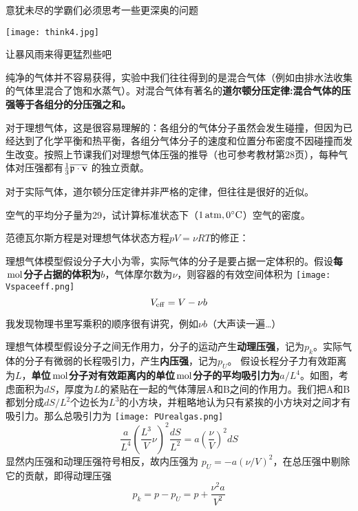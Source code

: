 \documentclass[CJK]{beamer}
\begin{document}
\begin{frame}
\bch
意犹未尽的学霸们必须思考一些更深奥的问题

\bcenter
{}
\texttt{[image: think4.jpg]}

让暴风雨来得更猛烈些吧
\emini
\ecenter
\ech
\end{frame}


\begin{frame}
\bch
纯净的气体并不容易获得，实验中我们往往得到的是混合气体（例如由排水法收集的气体里混合了饱和水蒸气）。对混合气体有著名的{\bf 道尔顿分压定律:混合气体的压强等于各组分的分压强之和。}

\skipline

对于理想气体，这是很容易理解的：各组分的气体分子虽然会发生碰撞，但因为已经达到了化学平衡和热平衡，各组分气体分子的速度和位置分布密度不因碰撞而发生改变。按照上节课我们对理想气体压强的推导（也可参考教材第28页），每种气体对压强都有$\frac{1}{3}\overline{\mathbf{\mathfrak{p}}\cdot{\mathbf{v}}}$ 的独立贡献。

\skipline

对于实际气体，道尔顿分压定律并非严格的定律，但往往是很好的近似。
\ech
\end{frame}


\begin{frame}
\bch
空气的平均分子量为29，试计算标准状态下（$1\,\mathrm{atm}, 0^\circ \mathrm{C}$）空气的密度。
\ech
\end{frame}

\begin{frame}
\bch
范德瓦尔斯方程是对理想气体状态方程$pV = \nu RT$的修正：
\bitem
\item{理想气体模型假设分子大小为零，实际气体的分子是要占据一定体积的。假设{\bf 每$\,\mathrm{mol}$分子占据的体积为$b$}，气体摩尔数为$\nu$，则容器的有效空间体积为
\texttt{[image: Vspaceeff.png]}
\emini
{}
$$ V_{\rm eff} = V - \nu b$$

\skipline

我发现物理书里写乘积的顺序很有讲究，例如$\nu b$（大声读一遍…）
\emini
}
\eitem
\ech
\end{frame}

\begin{frame}
\bch
\bitem
\item{\small 理想气体模型假设分子之间无作用力，分子的运动产生{\bf 动理压强}，记为$p_k$。实际气体的分子有微弱的长程吸引力，产生{\bf 内压强}，记为$p_U$。
假设长程分子力有效距离为$L$，{\bf 单位$\,\mathrm{mol}$分子对有效距离内的单位$\,\mathrm{mol}$分子的平均吸引力为$a/L^4$}。如图，考虑面积为$dS$，厚度为$L$的紧贴在一起的气体薄层A和B之间的作用力。我们把A和B都划分成$dS/L^2$个边长为$L^3$的小方块，并粗略地认为只有紧挨的小方块对之间才有吸引力。那么总吸引力为}
\eitem
{}
\texttt{[image: PUrealgas.png]}
\emini
{}
{\small  
$$ \frac{a}{L^4}\left(\frac{L^3}{V}\nu\right)^2 \frac{dS}{L^2} = a \left(\frac{\nu}{V}\right)^2 dS$$
显然内压强和动理压强符号相反，故内压强为 $p_U = - a(\nu/V)^2$，在总压强中剔除它的贡献，即得动理压强
$$p_k = p - p_U = p + \frac{\nu^2 a}{V^2}$$
}
\emini
\ech
\end{frame}
\end{document}
